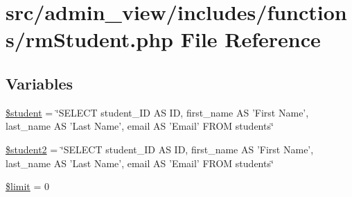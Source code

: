 \hypertarget{rmStudent_8php}{\section{src/admin\-\_\-view/includes/functions/rm\-Student.php \-File \-Reference}
\label{rmStudent_8php}
}
\subsection*{\-Variables}
\begin{DoxyCompactItemize}
\item 
\hyperlink{rmStudent_8php_a5a5a2522ab0ea5c503744aa937fac0e2}{\$student} = \char`\"{}\-S\-E\-L\-E\-C\-T student\-\_\-\-I\-D \-A\-S \-I\-D, first\-\_\-name \-A\-S '\-First \-Name', last\-\_\-name \-A\-S '\-Last \-Name', email \-A\-S '\-Email' \-F\-R\-O\-M students\char`\"{}
\item 
\hyperlink{rmStudent_8php_ab33f3ff56807c01248a10bae610fc52a}{\$student2} = \char`\"{}\-S\-E\-L\-E\-C\-T student\-\_\-\-I\-D \-A\-S \-I\-D, first\-\_\-name \-A\-S '\-First \-Name', last\-\_\-name \-A\-S '\-Last \-Name', email \-A\-S '\-Email' \-F\-R\-O\-M students\char`\"{}
\item 
\hyperlink{rmStudent_8php_ae05862a0294251c88629b141b5ce329a}{\$limit} = 0
\end{DoxyCompactItemize}


